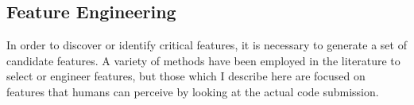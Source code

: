

\begin{comment}
Since terminology across research domains can vary, I will define the terms in which I will describe previous research and my own: 
\begin{itemize}
\item A solution is code that a particular person wrote in response to a prompt or problem description.
\item Solution clusters represent different patterns of implementation. For example, there may be two distinct solution clusters, both achieving the same input-output behavior but by different means. 
\item A solution path is a series of code snapshots generated while a person is working toward meeting a particular input-output behavior specification. 
\item The ``space of student solutions'' refers to the aggregation of student-generated solutions and the solution clusters they form.
\end{itemize}
\end{comment}


\subsection{Feature Engineering}

In order to discover or identify critical features, it is necessary to generate a set of candidate features. A variety of methods have been employed in the literature to select or engineer features, but those which I describe here are focused on features that humans can perceive by looking at the actual code submission.

